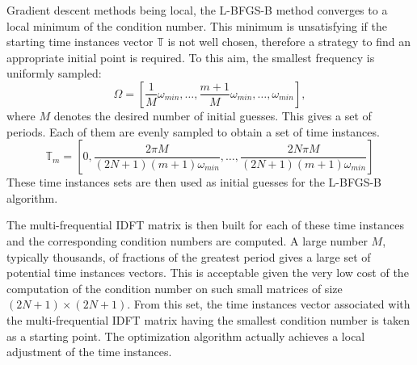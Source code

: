 Gradient descent methods being local, the L-BFGS-B method converges to a local
minimum of the condition number. This minimum is unsatisfying if the
starting time instances vector $\mathbb{T}$ is not well chosen, therefore a strategy
to find an appropriate initial point is required. To this aim, the smallest
frequency is uniformly sampled:
\begin{equation}
    \Omega = [\frac{1}{M} \omega_{min}, \ldots, \frac{m+1}{M} \omega_{min}, \ldots, \omega_{min}],
    \label{eq:slitted_period}
\end{equation}
where $M$ denotes the desired number of initial guesses.
This gives a set of periods. Each of them are evenly sampled to obtain a
set of time instances. 
\begin{equation}
    \mathbb{T}_m = \left[ 0, \frac{2 \pi M}{ (2N + 1) (m+1) \omega_{min}}, \ldots, 
                             \frac{2N \pi M}{ (2N + 1) (m+1) \omega_{min}} \right]
    \label{eq:set_of_tlv}
\end{equation}
These time instances sets are then used as initial guesses for the
L-BFGS-B algorithm.

The multi-frequential IDFT matrix is then built for
each of these time instances and the corresponding condition numbers are
computed. A large number $M$, typically thousands, of fractions of the
greatest period gives a large set of potential time instances vectors.
This is acceptable given the very low cost of the computation of the
condition number on such small matrices of size $(2N + 1) \times
(2N+1)$.  From this set, the time instances vector associated with the
multi-frequential IDFT matrix having the smallest condition number is
taken as a starting point.  The optimization algorithm actually achieves
a local adjustment of the time instances.

